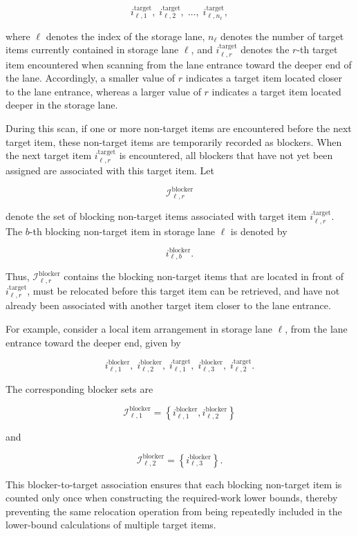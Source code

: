 \[
i^{\mathrm{target}}_{\ell,1},
\;
i^{\mathrm{target}}_{\ell,2},
\;
\ldots,
\;
i^{\mathrm{target}}_{\ell,n_\ell},
\]

where \(\ell\) denotes the index of the storage lane, \(n_\ell\) denotes the
number of target items currently contained in storage lane \(\ell\), and
\(i^{\mathrm{target}}_{\ell,r}\) denotes the \(r\)-th target item encountered
when scanning from the lane entrance toward the deeper end of the lane.
Accordingly, a smaller value of \(r\) indicates a target item located closer to
the lane entrance, whereas a larger value of \(r\) indicates a target item
located deeper in the storage lane.

During this scan, if one or more non-target items are encountered before the
next target item, these non-target items are temporarily recorded as blockers.
When the next target item \(i^{\mathrm{target}}_{\ell,r}\) is encountered, all
blockers that have not yet been assigned are associated with this target item.
Let

\[
\mathcal{I}^{\mathrm{blocker}}_{\ell,r}
\]

denote the set of blocking non-target items associated with target item
\(i^{\mathrm{target}}_{\ell,r}\). The \(b\)-th blocking non-target item in
storage lane \(\ell\) is denoted by

\[
i^{\mathrm{blocker}}_{\ell,b}.
\]

Thus, \(\mathcal{I}^{\mathrm{blocker}}_{\ell,r}\) contains the blocking
non-target items that are located in front of
\(i^{\mathrm{target}}_{\ell,r}\), must be relocated before this target item can
be retrieved, and have not already been associated with another target item
closer to the lane entrance.

For example, consider a local item arrangement in storage lane \(\ell\), from
the lane entrance toward the deeper end, given by

\[
i^{\mathrm{blocker}}_{\ell,1},
\;
i^{\mathrm{blocker}}_{\ell,2},
\;
i^{\mathrm{target}}_{\ell,1},
\;
i^{\mathrm{blocker}}_{\ell,3},
\;
i^{\mathrm{target}}_{\ell,2}.
\]

The corresponding blocker sets are

\[
\mathcal{I}^{\mathrm{blocker}}_{\ell,1}
=
\left\{
i^{\mathrm{blocker}}_{\ell,1},
i^{\mathrm{blocker}}_{\ell,2}
\right\}
\]

and

\[
\mathcal{I}^{\mathrm{blocker}}_{\ell,2}
=
\left\{
i^{\mathrm{blocker}}_{\ell,3}
\right\}.
\]

This blocker-to-target association ensures that each blocking non-target item
is counted only once when constructing the required-work lower bounds, thereby
preventing the same relocation operation from being repeatedly included in the
lower-bound calculations of multiple target items.

